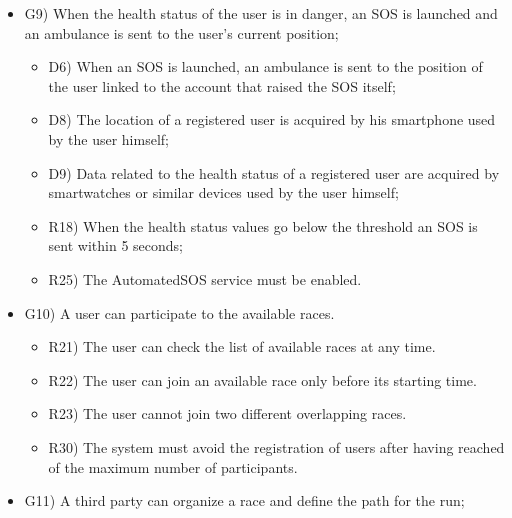 \documentclass{article}
\begin{document}
\begin{legal}
\begin{legal}
\begin{legal}
\begin{itemize}
{\begin{itemize}
					\end{itemize}
				}
				\item G9) When the health status of the user is in danger, an SOS is launched and an ambulance is sent to the user’s current position;\\
				{\normalfont
					\begin{itemize}
					\item D6) When an SOS is launched, an ambulance is sent to the position of the user linked to the account that raised the SOS itself;\\
					\item D8) The location of a registered user is acquired by his smartphone used by the user himself;\\
	 				\item D9) Data related to the health status of a registered user are acquired by smartwatches or similar devices used by the user himself;\\
					\item R18) When the health status values go below the threshold an SOS is sent within 5 seconds;\\
	 				\item R25) The AutomatedSOS service must be enabled.\\
					\end{itemize}
				}
				\item G10) A user can participate to the available races. \\
				{\normalfont
					\begin{itemize}
					\item R21) The user can check the list of available races at any time.\\
					\item R22) The user can join an available race only before its starting time.\\
	 				\item R23) The user cannot join two different overlapping races.\\
					\item R30) The system must avoid the registration of users after having reached of the maximum number of participants.\\
					\end{itemize}
				}
				\item G11) A third party can organize a race and define the path for the run;\\
				{\normalfont
					\begin{itemize}

\end{itemize}}
\end{itemize}
\end{legal}
\end{legal}
\end{legal}
\end{document}
